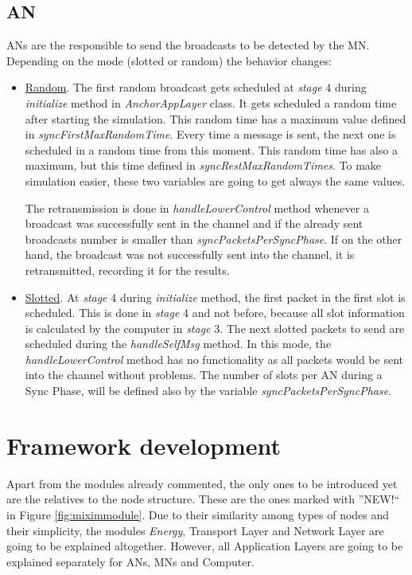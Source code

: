 \subsection{\ac{AN}}

\acp{AN} are the responsible to send the broadcasts to be detected by the \ac{MN}. Depending on the mode (slotted or random) the 
behavior changes:
\begin{itemize}
 \item \underline{Random}. The first random broadcast gets scheduled at \textit{stage} 4 during \textit{initialize} method in \textit{AnchorAppLayer}
class. It gets scheduled a random time after starting the simulation. This random time has a maximum value defined in 
\textit{syncFirstMaxRandomTime}. Every time a message is sent, the next one is scheduled in a random time from this moment. This random 
time has also a maximum, but this time defined in \textit{syncRestMaxRandomTimes}. To make simulation easier, these two variables are going to get
always the same values.

The retransmission is done in \textit{handleLowerControl}
method whenever a broadcast was successfully sent in the channel and if the already sent broadcasts number is smaller than 
\textit{syncPacketsPerSyncPhase}. If on the other hand, the broadcast was not successfully sent into the channel, it is retransmitted, recording
it for the results.
 \item \underline{Slotted}. At \textit{stage} 4 during \textit{initialize} method, the first packet in the first slot is scheduled. This is done
in \textit{stage} 4 and not before, because all slot information is calculated by the computer in \textit{stage} 3. The next slotted packets to
send are scheduled during the \textit{handleSelfMsg} method. In this mode, the \textit{handleLowerControl} method has no functionality as all 
packets would be sent into the channel without problems. The number of slots per \ac{AN} during a Sync Phase, will be defined also by the variable 
\textit{syncPacketsPerSyncPhase}.
\end{itemize}


\section{Framework development}
\label{sec:frameworkdevelopment}

Apart from the modules already commented, the only ones to be introduced yet are the relatives to the node structure. These are the ones marked
with ''NEW$!$`` in Figure \ref{fig:miximmodule}. Due to their similarity among types of nodes and their simplicity, the modules 
\textit{Energy}, Transport Layer and Network Layer are going to be explained altogether. However, all Application Layers are going to be 
explained separately for \acp{AN}, \acp{MN} and Computer.

